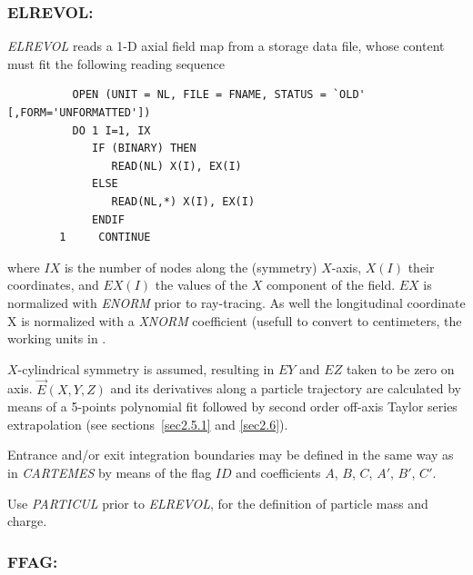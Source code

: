 \newpage

\subsubsection*{ELREVOL: \ELREVOLTitl}  \label{ELREVOL}
\medskip

\textsl{ELREVOL}  reads a 1-D axial field map from a storage data file,
whose content must fit the following \FORTRAN reading sequence  


{\footnotesize
\begin{verbatim}
	      OPEN (UNIT = NL, FILE = FNAME, STATUS = `OLD' [,FORM='UNFORMATTED'])
	      DO 1 I=1, IX
	         IF (BINARY) THEN 
	            READ(NL) X(I), EX(I)
	         ELSE
	            READ(NL,*) X(I), EX(I)
	         ENDIF 
        1     CONTINUE
\end{verbatim}}%
\bigskip

\noindent where $IX$ is the number of nodes along the (symmetry) $X$-axis, $X(I)$ their 
coordinates, and $EX(I)$ the values of the $X$ component of the field. $EX$ is 
normalized with \textsl{ENORM} prior to ray-tracing. As well the longitudinal coordinate  X is normalized with 
a  \textsl{XNORM} coefficient (usefull to convert to centimeters, the working units in  \zgoubi. 


\bigskip

\noindent$X$-cylindrical symmetry is assumed, resulting in $EY$
and $EZ$ taken to be zero on axis. $ \vec  E(X,Y,Z) $ and its derivatives along a particle
trajectory are calculated by means of a 5-points polynomial fit followed by second 
order off-axis Taylor series extrapolation (see sections~\ref{sec2.5.1} and \ref{sec2.6}).  
\bigskip

\noindent Entrance and/or exit integration boundaries may be defined in the same way 
as in \textsl{CARTEMES} by means of the flag $ID$ and coefficients  
$A$, $B$, $C$, $A'$, $B'$, $C'$.  
\bigskip

\noindent Use \textsl{PARTICUL} prior to \textsl{ELREVOL}, for the
 definition of particle mass and charge.










\newpage


\subsubsection*{FFAG: \FFAGTitl~\cite{reportNIMFFAG}} \label{FFAG} 
\medskip

